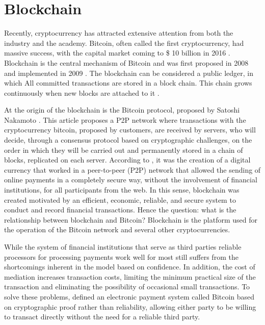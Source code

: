 \section{Blockchain}\label{sec:blockchain}

Recently, cryptocurrency has attracted extensive attention from both the industry and the academy. Bitcoin, often called the first cryptocurrency, had massive success, with the capital market coming to \$ 10 billion in 2016 \cite{coindesk}. Blockchain is the central mechanism of Bitcoin and was first proposed in 2008 and implemented in 2009 \cite{nakamoto2008bitcoin}. The blockchain can be considered a  public ledger, in which All committed transactions are stored in a block chain. This chain grows continuously when new blocks are attached to it \cite{zheng2016blockchain}.

At the origin of the blockchain is the Bitcoin protocol, proposed by Satoshi Nakamoto \cite{nakamoto2008bitcoin}. This article proposes a P2P network where transactions with the cryptocurrency bitcoin, proposed by customers, are received by servers, who will decide, through a consensus protocol based on cryptographic challenges, on the order in which they will be carried out and permanently stored in a chain of blocks, replicated on each server. According to , it was the creation of a digital currency that worked in a peer-to-peer (P2P) network that allowed the sending of online payments in a completely secure way, without the involvement of financial institutions, for all participants from the web. In this sense, blockchain was created motivated by an efficient, economic, reliable, and secure system to conduct and record financial transactions. Hence the question: what is the relationship between blockchain and Bitcoin? Blockchain is the platform used for the operation of the Bitcoin network and several other cryptocurrencies.

While the system of financial institutions that serve as third parties reliable processors for processing payments work well for most still suffers from the shortcomings inherent in the model based on confidence. In addition, the cost of mediation increases transaction costs, limiting the minimum practical size of the transaction and eliminating the possibility of occasional small transactions. To solve these problems, \cite{nakamoto2008bitcoin} defined an electronic payment system called Bitcoin based on cryptographic proof rather than reliability, allowing either party to be willing to transact directly without the need for a reliable third party.

